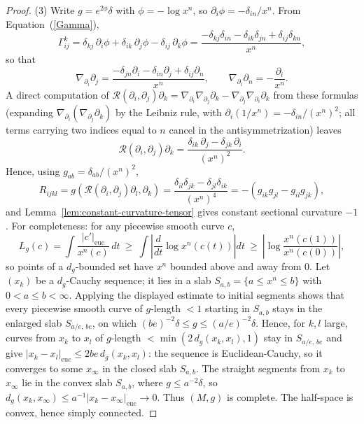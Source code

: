 \begin{proof}
(3) Write $g=e^{2\phi}\delta$ with $\phi=-\log x^n$, so
$\partial_i\phi=-\delta_{in}/x^n$. From
Equation~(\ref{Gamma}),
$$\Gamma^k_{ij}=\delta_{kj}\,\partial_i\phi
+\delta_{ik}\,\partial_j\phi-\delta_{ij}\,\partial_k\phi
=\frac{-\delta_{kj}\delta_{in}-\delta_{ik}\delta_{jn}
+\delta_{ij}\delta_{kn}}{x^n},$$
so that
$$\nabla_{\partial_i}\partial_j=\frac{-\delta_{jn}\partial_i
-\delta_{in}\partial_j+\delta_{ij}\partial_n}{x^n},\qquad
\nabla_{\partial_i}\partial_n=-\frac{\partial_i}{x^n}.$$
A direct computation of ${\mathcal
R}(\partial_i,\partial_j)\partial_k
=\nabla_{\partial_i}\nabla_{\partial_j}\partial_k
-\nabla_{\partial_j}\nabla_{\partial_i}\partial_k$ from these
formulas (expanding
$\nabla_{\partial_i}\left(\nabla_{\partial_j}\partial_k\right)$ by
the Leibniz rule, with $\partial_i(1/x^n)=-\delta_{in}/(x^n)^2$;
all terms carrying two indices equal to $n$ cancel in the
antisymmetrization) leaves
$${\mathcal R}(\partial_i,\partial_j)\partial_k
=\frac{\delta_{ik}\,\partial_j-\delta_{jk}\,\partial_i}{(x^n)^2}.$$
Hence, using $g_{ab}=\delta_{ab}/(x^n)^2$,
$$R_{ijkl}=g\left({\mathcal
R}(\partial_i,\partial_j)\partial_l,\partial_k\right)
=\frac{\delta_{il}\delta_{jk}-\delta_{jl}\delta_{ik}}{(x^n)^4}
=-\left(g_{ik}g_{jl}-g_{il}g_{jk}\right),$$
and Lemma~\ref{lem:constant-curvature-tensor} gives constant
sectional curvature $-1$. For completeness: for any piecewise
smooth curve $c$,
$$L_g(c)=\int\frac{|c'|_{\mathrm{euc}}}{x^n(c)}\,dt
\ \ge\ \int\left|\frac{d}{dt}\log x^n(c(t))\right|dt
\ \ge\ \left|\log\frac{x^n(c(1))}{x^n(c(0))}\right|,$$
so points of a $d_g$-bounded set have $x^n$ bounded above and away
from $0$. Let $(x_k)$ be a $d_g$-Cauchy sequence; it lies in a
slab $S_{a,b}=\{a\le x^n\le b\}$ with $0<a\le b<\infty$. Applying
the displayed estimate to initial segments shows that every
piecewise smooth curve of $g$-length $<1$ starting in $S_{a,b}$
stays in the enlarged slab $S_{a/e,\,be}$, on which
$(be)^{-2}\delta\le g\le(a/e)^{-2}\delta$. Hence, for $k,l$ large,
curves from $x_k$ to $x_l$ of $g$-length
$<\min\left(2\,d_g(x_k,x_l),1\right)$ stay in $S_{a/e,\,be}$ and
give $|x_k-x_l|_{\mathrm{euc}}\le 2be\,d_g(x_k,x_l)$: the sequence
is Euclidean-Cauchy, so it converges to some $x_\infty$ in the
closed slab $S_{a,b}$. The straight segments from $x_k$ to
$x_\infty$ lie in the convex slab $S_{a,b}$, where $g\le
a^{-2}\delta$, so $d_g(x_k,x_\infty)\le
a^{-1}|x_k-x_\infty|_{\mathrm{euc}}\to0$. Thus $(M,g)$ is
complete. The half-space is convex, hence simply
connected.


\end{proof}

